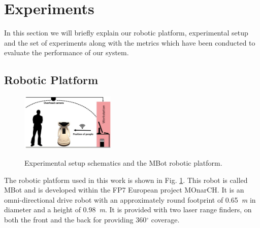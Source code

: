 \section{Experiments}
\label{exp}
In this section we will briefly explain our robotic platform, experimental setup and the set of experiments along with the metrics which have been conducted to evaluate the performance of our system.

\subsection{Robotic Platform}
\label{sec:robot}

\begin{figure}
\centering
\includegraphics[width=0.4\textwidth]{pictures/setup.jpg}\label{fig:robot}%
\caption{Experimental setup schematics and the MBot robotic platform.}
\label{fig:setup}
\end{figure}





The robotic platform used in this work is shown in Fig. \ref{fig:setup}. This robot is called MBot \cite{Messias2014robotic} and is developed within the FP7 European project MOnarCH.
It is an omni-directional drive robot with an approximately round footprint of 0.65~\textit{m} in diameter and a height of 0.98~\textit{m}.
It is provided with two laser range finders, on both the front and the back for providing 360$^{\circ}$ coverage.

